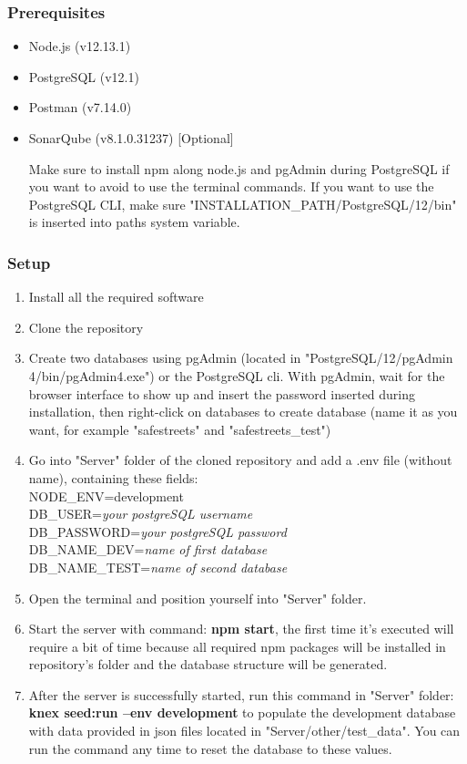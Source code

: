 \subsubsection{Prerequisites}
\begin{itemize}
	\item Node.js (v12.13.1)
	\item PostgreSQL (v12.1)
	\item Postman (v7.14.0)
	\item SonarQube (v8.1.0.31237)	[Optional]
	
	Make sure to install npm along node.js and pgAdmin during PostgreSQL if you want to avoid to use the terminal commands. If you want to use the PostgreSQL CLI, make sure "INSTALLATION\_PATH/PostgreSQL/12/bin" is inserted into paths system variable.
\end{itemize}

\subsubsection{Setup}
\begin{enumerate}
	\item Install all the required software
	\item Clone the repository
	\item Create two databases using pgAdmin (located in "PostgreSQL/12/pgAdmin 4/bin/pgAdmin4.exe") or the PostgreSQL cli. With pgAdmin, wait for the browser interface to show up and insert the password inserted during installation, then right-click on databases to create database (name it as you want, for example "safestreets" and "safestreets\_test")
	\item Go into "Server" folder of the cloned repository and add a .env file (without name), containing these fields:\\
	NODE\_ENV=development\\
	DB\_USER=\textit{your postgreSQL username}\\
	DB\_PASSWORD=\textit{your postgreSQL password}\\
	DB\_NAME\_DEV=\textit{name of first database}\\
	DB\_NAME\_TEST=\textit{name of second database}\\
	\item Open the terminal and position yourself into "Server" folder.
	\item Start the server with command: \textbf{npm start}, the first time it's executed will require a bit of time because all required npm packages will be installed in repository's folder and the database structure will be generated.
	\item After the server is successfully started, run this command in "Server" folder: \textbf{knex seed:run --env development} to populate the development database with data provided in json files located in "Server/other/test\_data". You can run the command any time to reset the database to these values.
\end{enumerate}

